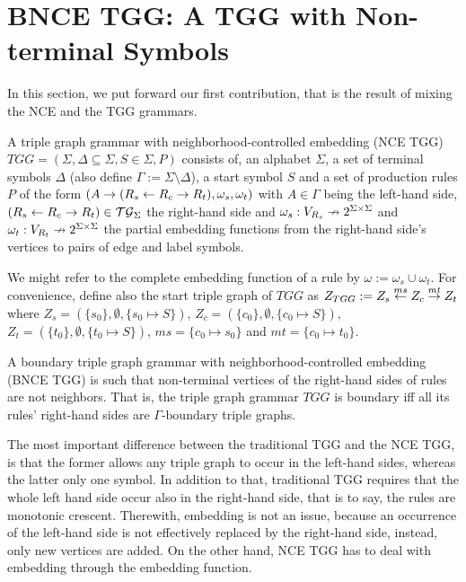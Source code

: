 \documentclass[runningheads]{llncs}
\begin{document}
\section{BNCE TGG: A TGG with Non-terminal Symbols}
\label{sec:bncetgg}
In this section, we put forward our first contribution, that is the result of mixing the NCE and the TGG grammars.

\begin{definition}
	A triple graph grammar with neighborhood-controlled embedding (NCE TGG) $TGG = (\Sigma, \Delta \subseteq \Sigma, S \in \Sigma, P)$ consists of, an alphabet $\Sigma$, a set of terminal symbols $\Delta$ (also define $\Gamma := \Sigma \setminus \Delta$), a start symbol $S$ and a set of production rules $P$ of the form $(A \to (R_s \overset{}{\leftarrow} R_c \overset{}{\rightarrow} R_t), \omega_s, \omega_t)$ with $A \in \Gamma$ being the left-hand side, $(R_s \overset{}{\leftarrow} R_c \overset{}{\rightarrow} R_t) \in \mathcal{TG}_{\Sigma}$ the right-hand side and $\omega_s : V_{R_s} \nrightarrow 2^{\Sigma \times \Sigma}$ and $\omega_t : V_{R_t} \nrightarrow 2^{\Sigma \times \Sigma}$ the partial embedding functions from the right-hand side's vertices to pairs of edge and label symbols.
\end{definition}

We might refer to the complete embedding function of a rule by $\omega:= \omega_s \cup \omega_t$. For convenience, define also the start triple graph of $TGG$ as $Z_{TGG} := Z_s \overset{ms}{\leftarrow} Z_c \overset{mt}{\rightarrow} Z_t$ where $Z_s = (\{s_0\},\emptyset,\{s_0 \mapsto S\})$, $Z_c = (\{c_0\},\emptyset,\{c_0 \mapsto S\})$, $Z_t = (\{t_0\},\emptyset,\{t_0 \mapsto S\})$, $ms = \{c_0 \mapsto s_0 \}$ and $mt = \{c_0 \mapsto t_0 \}$.

\begin{definition}
	A boundary triple graph grammar with neighborhood-controlled embedding (BNCE TGG) is such that non-terminal vertices of the right-hand sides of rules are not neighbors. That is, the triple graph grammar $TGG$ is boundary iff all its rules' right-hand sides are $\Gamma\text{-boundary}$ triple graphs.
\end{definition}

The most important difference between the traditional TGG and the NCE TGG, is that the former allows any triple graph to occur in the left-hand sides, whereas the latter only one symbol. In addition to that, traditional TGG requires that the whole left hand side occur also in the right-hand side, that is to say, the rules are monotonic crescent. Therewith, embedding is not an issue, because an occurrence of the left-hand side is not effectively replaced by the right-hand side, instead, only new vertices are added. On the other hand, NCE TGG has to deal with embedding through the embedding function.
\end{document}
